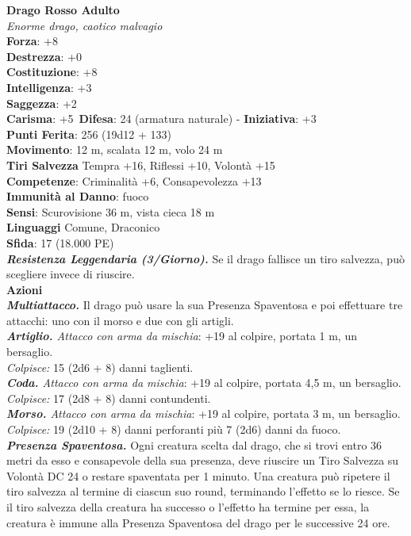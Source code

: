 \begin{multicols}{2}
\medskip\textbf{Drago Rosso Adulto}\\
\emph{Enorme drago, caotico malvagio}\\
\textbf{Forza}: +8\\
\textbf{Destrezza}: +0\\
\textbf{Costituzione}: +8\\
\textbf{Intelligenza}: +3\\
\textbf{Saggezza}: +2\\
\textbf{Carisma}: +5\
\textbf{Difesa}: 24 (armatura naturale) - \textbf{Iniziativa}: +3\\
\textbf{Punti Ferita}: 256 (19d12 + 133)\\
\textbf{Movimento}: 12 m, scalata 12 m, volo 24 m\\
\textbf{Tiri Salvezza} Tempra +16, Riflessi +10, Volontà +15\\
\textbf{Competenze}: Criminalità +6, Consapevolezza +13\\
\textbf{Immunità al Danno}: fuoco\\
\textbf{Sensi}: Scurovisione 36 m, vista cieca 18 m\\
\textbf{Linguaggi} Comune, Draconico\\
\textbf{Sfida}: 17 (18.000 PE)\smallskip\\
\emph{\textbf{Resistenza Leggendaria (3/Giorno).}} Se il drago fallisce un tiro salvezza, può scegliere invece di riuscire.\\
\smallskip\textbf{Azioni}\\
\emph{\textbf{Multiattacco.}} Il drago può usare la sua Presenza Spaventosa e poi effettuare tre attacchi: uno con il morso e due con gli artigli.\\
\emph{\textbf{Artiglio.} Attacco con arma da mischia}: +19 al colpire, portata 1 m, un bersaglio.\\
\emph{Colpisce:} 15 (2d6 + 8) danni taglienti.\\
\emph{\textbf{Coda.} Attacco con arma da mischia}: +19 al colpire, portata 4,5 m, un bersaglio.\\
\emph{Colpisce:} 17 (2d8 + 8) danni contundenti.\\
\emph{\textbf{Morso.} Attacco con arma da mischia}: +19 al colpire, portata 3 m, un bersaglio.\\
\emph{Colpisce:} 19 (2d10 + 8) danni perforanti più 7 (2d6) danni da fuoco.\\
\emph{\textbf{Presenza Spaventosa.}} Ogni creatura scelta dal drago, che si trovi entro 36 metri da esso e consapevole della sua presenza, deve riuscire un Tiro Salvezza su Volontà DC  24 o restare spaventata per 1 minuto. Una creatura può ripetere il tiro salvezza al termine di ciascun suo round, terminando l'effetto se lo riesce. Se il tiro salvezza della creatura ha successo o l'effetto ha termine per essa, la creatura è immune alla Presenza Spaventosa del drago per le successive 24 ore.\\

\end{multicols}
